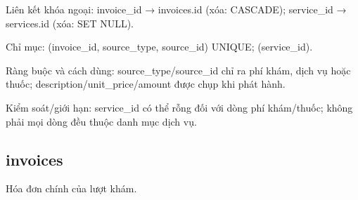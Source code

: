 Liên kết khóa ngoại:\allowbreak{} invoice\_\allowbreak{}id → invoices.\allowbreak{}id (xóa:\allowbreak{} CASCADE); service\_\allowbreak{}id → services.\allowbreak{}id (xóa:\allowbreak{} SET NULL).\allowbreak{}

Chỉ mục:\allowbreak{} (invoice\_\allowbreak{}id, source\_\allowbreak{}type, source\_\allowbreak{}id) UNIQUE; (service\_\allowbreak{}id).\allowbreak{}

Ràng buộc và cách dùng:\allowbreak{} source\_\allowbreak{}type/\allowbreak{}source\_\allowbreak{}id chỉ ra phí khám, dịch vụ hoặc thuốc; description/\allowbreak{}unit\_\allowbreak{}price/\allowbreak{}amount được chụp khi phát hành.\allowbreak{}

Kiểm soát/\allowbreak{}giới hạn:\allowbreak{} service\_\allowbreak{}id có thể rỗng đối với dòng phí khám/\allowbreak{}thuốc; không phải mọi dòng đều thuộc danh mục dịch vụ.\allowbreak{}

\clearpage

\subsection{invoices}
Hóa đơn chính của lượt khám.\allowbreak{}


